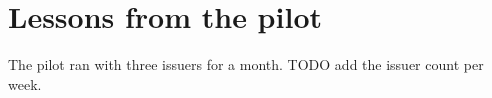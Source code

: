 \chapter{Lessons from the pilot}

The pilot ran with three issuers for a month. TODO add the issuer count per week.
